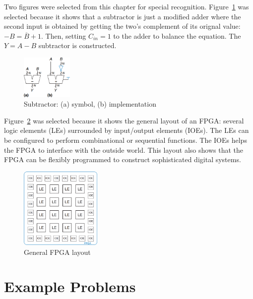 \documentclass[12pt]{article}
\numberwithin{figure}{subsection}
\numberwithin{table}{subsection}
\numberwithin{equation}{subsection}
\begin{document}
Two figures were selected from this chapter for special recognition. Figure~\ref{fig:subtractor_symbol_implementation} was selected because it shows that a subtractor is just a modified adder where the second input is obtained by getting the two's complement of its orignal value: $-B = \overline{B} + 1$. Then, setting $C_{in} = 1$ to the adder to balance the equation. The $Y = A - B$ subtractor is constructed.

\begin{figure}[ht]
    \centering
    \includegraphics[width=0.22\textwidth]{subtractor_symbol_implementation.png}
    \caption{Subtractor: (a) symbol, (b) implementation}
    \label{fig:subtractor_symbol_implementation}
\end{figure}

Figure~\ref{fig:general_fpga_layout} was selected because it shows the general layout of an FPGA: several logic elements (LEs) surrounded by input/output elements (IOEs). The LEs can be configured to perform combinational or sequential functions. The IOEs helps the FPGA to interface with the outside world. This layout also shows that the FPGA can be flexibly programmed to construct sophisticated digital systems.

\begin{figure}[ht]
    \centering
    \includegraphics[width=0.35\textwidth]{general_fpga_layout.png}
    \caption{General FPGA layout}
    \label{fig:general_fpga_layout}
\end{figure}

\section{Example Problems}
\end{document}
